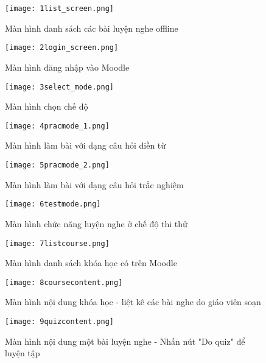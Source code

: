 \begin{figure}[!htb] 
\centering
\texttt{[image: 1list\_screen.png]}
\caption{Màn hình danh sách các bài luyện nghe offline}
\end{figure}

\newpage

\begin{figure}[!htb] 
\centering
\texttt{[image: 2login\_screen.png]}
\caption{Màn hình đăng nhập vào Moodle}
\end{figure}

\begin{figure}[!htb] 
\centering
\texttt{[image: 3select\_mode.png]}
\caption{Màn hình chọn chế độ}
\end{figure}

\newpage

\begin{figure}[!htb] 
\centering
\texttt{[image: 4pracmode\_1.png]}
\caption{Màn hình làm bài với dạng câu hỏi điền từ}
\end{figure}

\begin{figure}[!htb] 
\centering
\texttt{[image: 5pracmode\_2.png]}
\caption{Màn hình làm bài với dạng câu hỏi trắc nghiệm}
\end{figure}

\newpage

\begin{figure}[!htb] 
\centering
\texttt{[image: 6testmode.png]}
\caption{Màn hình chức năng luyện nghe ở chế độ thi thử}
\end{figure}

\begin{figure}[!htb] 
\centering
\texttt{[image: 7listcourse.png]}
\caption{Màn hình danh sách khóa học có trên Moodle}
\end{figure}

\newpage

\begin{figure}[!htb] 
\centering
\texttt{[image: 8coursecontent.png]}
\caption{Màn hình nội dung khóa học - liệt kê các bài nghe do giáo viên soạn}
\end{figure}

\begin{figure}[!htb] 
\centering
\texttt{[image: 9quizcontent.png]}
\caption{Màn hình nội dung một bài luyện nghe - Nhấn nút "Do quiz" để luyện tập}
\end{figure}

